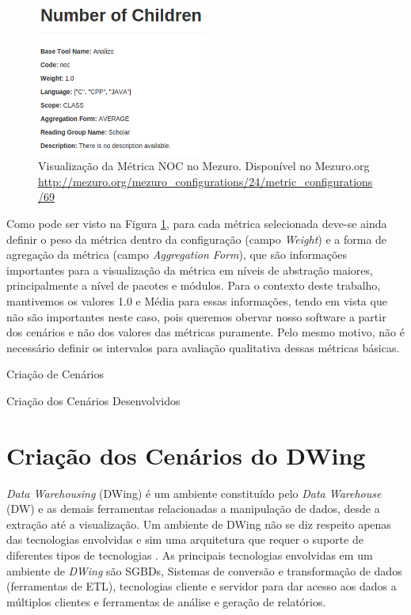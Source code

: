 \graphicspath{{figuras/}}
\begin{figure}[h]
\centering
\includegraphics[width=0.5\textwidth]{metric_example}
\caption{Visualização da Métrica NOC no Mezuro. Disponível no Mezuro.org \url{http://mezuro.org/mezuro_configurations/24/metric_configurations/69}}
\label{metric_example}
\end{figure}

Como pode ser visto na Figura \ref{metric_example}, para cada métrica selecionada deve-se ainda definir o peso da métrica dentro da configuração (campo \emph{Weight}) e a forma de agregação da métrica (campo \emph{Aggregation Form}), que são informações importantes para a visualização da métrica em níveis de abstração maiores, principalmente a nível de pacotes e módulos. Para o contexto deste trabalho, mantivemos os valores 1.0 e Média para essas informações, tendo em vista que não são importantes neste caso, pois queremos obervar nosso software a partir dos cenários e não dos valores das métricas puramente. Pelo mesmo motivo, não é necessário definir os intervalos para avaliação qualitativa dessas métricas básicas.

\begin{description}
	\item[Criação de Cenários]
\end{description}


\begin{description}
	\item[Criação dos Cenários Desenvolvidos]
\end{description}


\section{Criação dos Cenários do DWing}
\label{dw-cenarios}

\emph{Data Warehousing} (DWing) é um ambiente constituído pelo \emph{Data Warehouse} (DW) e as demais ferramentas relacionadas a manipulação de dados, desde a extração até a visualização. Um ambiente de DWing não se diz respeito apenas das tecnologias envolvidas e sim uma arquitetura que requer o suporte de diferentes tipos de tecnologias \cite{inmon2002}.  As principais tecnologias envolvidas em um ambiente de \emph{DWing} são SGBDs, Sistemas de conversão e transformação de dados (ferramentas de ETL), tecnologias cliente e servidor para dar acesso aos dados a múltiplos clientes e ferramentas de análise e geração de relatórios.


